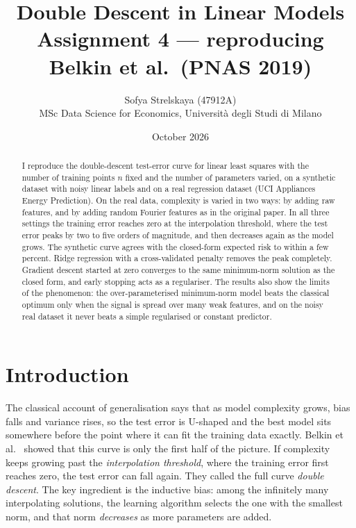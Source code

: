 \documentclass[10pt,a4paper]{article}
\title{\textbf{Double Descent in Linear Models}\\[2pt]
\large Assignment 4 --- reproducing Belkin et al.\ (PNAS 2019)}
\author{Sofya Strelskaya (47912A)\\
\small MSc Data Science for Economics, Universit\`a degli Studi di Milano}
\date{October 2026}
\begin{document}
\maketitle

\begin{abstract}
\noindent
I reproduce the double-descent test-error curve for linear least squares with the number of training points $n$ fixed and the number of parameters varied, on a synthetic dataset with noisy linear labels and on a real regression dataset (UCI Appliances Energy Prediction). On the real data, complexity is varied in two ways: by adding raw features, and by adding random Fourier features as in the original paper. In all three settings the training error reaches zero at the interpolation threshold, where the test error peaks by two to five orders of magnitude, and then decreases again as the model grows. The synthetic curve agrees with the closed-form expected risk to within a few percent. Ridge regression with a cross-validated penalty removes the peak completely. Gradient descent started at zero converges to the same minimum-norm solution as the closed form, and early stopping acts as a regulariser. The results also show the limits of the phenomenon: the over-parameterised minimum-norm model beats the classical optimum only when the signal is spread over many weak features, and on the noisy real dataset it never beats a simple regularised or constant predictor.
\end{abstract}

\section{Introduction}
The classical account of generalisation says that as model complexity grows, bias falls and variance rises, so the test error is U-shaped and the best model sits somewhere before the point where it can fit the training data exactly. Belkin et al.~\cite{belkin2019} showed that this curve is only the first half of the picture. If complexity keeps growing past the \emph{interpolation threshold}, where the training error first reaches zero, the test error can fall again. They called the full curve \emph{double descent}. The key ingredient is the inductive bias: among the infinitely many interpolating solutions, the learning algorithm selects the one with the smallest norm, and that norm \emph{decreases} as more parameters are added.
\end{document}

